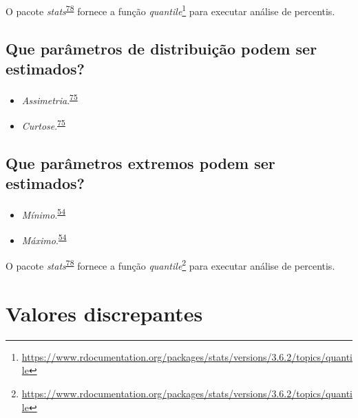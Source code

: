 \documentclass[
  a4paper,
]{book}
\renewcommand{\href}[2]{#2\footnote{\url{#1}}}
\newenvironment{infobox}[1]
  {
  \begin{itemize}
  \renewcommand{\labelitemi}{
    \raisebox{-.7\height}[0pt][0pt]{
      {\setkeys{Gin}{width=3em,keepaspectratio}
        \texttt{[image: \#1]}}
    }
  }
  \setlength{\fboxsep}{1em}
  \begin{blackbox}
  \item
  }
  {
  \end{blackbox}
  \end{itemize}
  }
\begin{document}
\begin{infobox}{images/Rlogo}
O pacote \emph{stats}\textsuperscript{\protect\hyperlink{ref-base}{78}} fornece a função \href{https://www.rdocumentation.org/packages/stats/versions/3.6.2/topics/quantile}{\emph{quantile}} para executar análise de percentis.

\end{infobox}

\hypertarget{que-paruxe2metros-de-distribuiuxe7uxe3o-podem-ser-estimados}{%
\subsection{Que parâmetros de distribuição podem ser estimados?}\label{que-paruxe2metros-de-distribuiuxe7uxe3o-podem-ser-estimados}}

\begin{itemize}
\item
  \emph{Assimetria}.\textsuperscript{\protect\hyperlink{ref-kanji2006}{75}}
\item
  \emph{Curtose}.\textsuperscript{\protect\hyperlink{ref-kanji2006}{75}}
\end{itemize}

\hypertarget{que-paruxe2metros-extremos-podem-ser-estimados}{%
\subsection{Que parâmetros extremos podem ser estimados?}\label{que-paruxe2metros-extremos-podem-ser-estimados}}

\begin{itemize}
\item
  \emph{Mínimo}.\textsuperscript{\protect\hyperlink{ref-Ali2016}{54}}
\item
  \emph{Máximo}.\textsuperscript{\protect\hyperlink{ref-Ali2016}{54}}
\end{itemize}

\begin{infobox}{images/Rlogo}
O pacote \emph{stats}\textsuperscript{\protect\hyperlink{ref-base}{78}} fornece a função \href{https://www.rdocumentation.org/packages/stats/versions/3.6.2/topics/quantile}{\emph{quantile}} para executar análise de percentis.

\end{infobox}

\hypertarget{outliers}{%
\section{Valores discrepantes}\label{outliers}}
\end{document}
